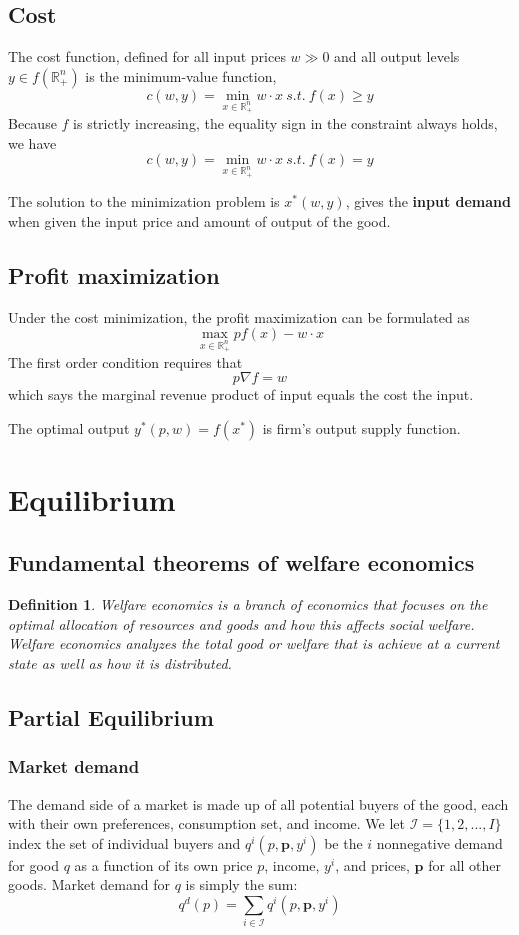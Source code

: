 \documentclass[a4paper,13pt]{report}
\newcommand{\R}{\mathbb{R}}
\newtheorem*{definition}{Definition}
\begin{document}
\subsection{Cost}
The cost function, defined for all input prices $w \gg 0$ and all output levels $y\in f(\R^n_+)$ is the minimum-value function,
$$c(w,y) = \min_{x\in \R^n_+} w\cdot x ~ s.t. ~ f(x) \geq y$$
Because $f$ is strictly increasing, the equality sign in the constraint always holds, we have
$$c(w,y) = \min_{x\in \R^n_+} w\cdot x ~ s.t. ~ f(x) = y$$

The solution to the minimization problem is $x^*(w,y)$, gives the \textbf{input demand} when given the input price and amount of output of the good.
\subsection{Profit maximization}
Under the cost minimization, the profit maximization can be formulated as
$$\max_{x\in \R^n_+} pf(x)-w\cdot x$$
The first order condition requires that 
$$p\nabla f = w$$
which says the marginal revenue product of input equals the cost the input. \cite{jehle2001advanced}

The optimal output $y^*(p,w) = f(x^*) $ is firm's output supply function.

\section{Equilibrium}
\subsection{Fundamental theorems of welfare economics}
\begin{definition}
Welfare economics is a branch of economics that focuses on the optimal allocation of resources and goods and how this affects social welfare. Welfare economics analyzes the total good or welfare that is achieve at a current state as well as how it is distributed.
\end{definition}

\subsection{Partial Equilibrium}
\subsubsection{Market demand}
The demand side of a market is made up of all potential buyers of the good, each with their own preferences, consumption set, and income. We let $\mathcal{I}=\{1,2,...,I\}$ index the set of individual buyers and $q^i(p,\bm{p},y^i)$ be the $i$ nonnegative demand for good $q$ as a function of its own price $p$, income, $y^i$, and prices, $\bm{p}$ for all other goods. Market demand for $q$ is simply the sum:\cite{jehle2001advanced}
$$q^d(p)=\sum_{i\in \mathcal{I}}q^i(p,\bm{p},y^i)$$
\end{document}
